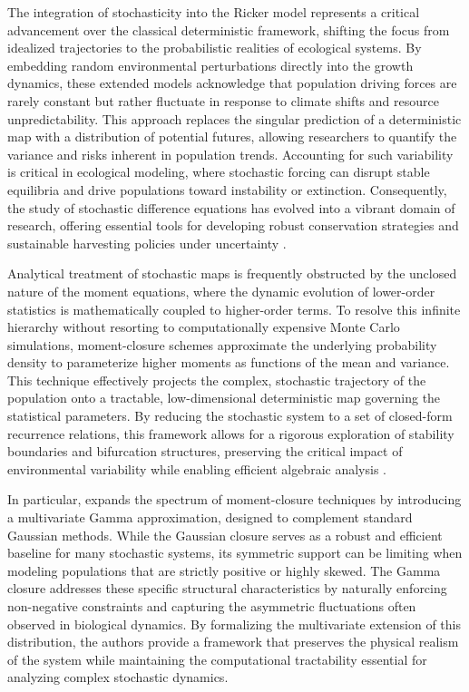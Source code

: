 \documentclass[12pt]{article}
\theoremstyle{definition}
\begin{document}
The integration of stochasticity into the Ricker model represents a critical advancement over the classical deterministic framework, shifting the focus from idealized trajectories to the probabilistic realities of ecological systems. By embedding random environmental perturbations directly into the growth dynamics, these extended models acknowledge that population driving forces are rarely constant but rather fluctuate in response to climate shifts and resource unpredictability. This approach replaces the singular prediction of a deterministic map with a distribution of potential futures, allowing researchers to quantify the variance and risks inherent in population trends. Accounting for such variability is critical in ecological modeling, where stochastic forcing can disrupt stable equilibria and drive populations toward instability or extinction. Consequently, the study of stochastic difference equations has evolved into a vibrant domain of research, offering essential tools for developing robust conservation strategies and sustainable harvesting policies under uncertainty \cite{allen2010,Arnold1998,kot2001elements,Schreiber2021,Braverman2013,Yan2024,Hognas1997,Kornadt1991}.


Analytical treatment of stochastic maps is frequently obstructed by the unclosed nature of the moment equations, where the dynamic evolution of lower-order statistics is mathematically coupled to higher-order terms. To resolve this infinite hierarchy without resorting to computationally expensive Monte Carlo simulations, moment-closure schemes approximate the underlying probability density to parameterize higher moments as functions of the mean and variance. This technique effectively projects the complex, stochastic trajectory of the population onto a tractable, low-dimensional deterministic map governing the statistical parameters. By reducing the stochastic system to a set of closed-form recurrence relations, this framework allows for a rigorous exploration of stability boundaries and bifurcation structures, preserving the critical impact of environmental variability while enabling efficient algebraic analysis \cite{Kuehn2016,Makarem2017,Marrec2023,Matis1996,Du2005,Hyon2008,allen2010,Socha2008,Lakatos_2015,Taylor2012}. 

In particular, \cite{Lakatos_2015} expands the spectrum of moment-closure techniques by introducing a multivariate Gamma approximation, designed to complement standard Gaussian methods. While the Gaussian closure serves as a robust and efficient baseline for many stochastic systems, its symmetric support can be limiting when modeling populations that are strictly positive or highly skewed. The Gamma closure addresses these specific structural characteristics by naturally enforcing non-negative constraints and capturing the asymmetric fluctuations often observed in biological dynamics. By formalizing the multivariate extension of this distribution, the authors provide a framework that preserves the physical realism of the system while maintaining the computational tractability essential for analyzing complex stochastic dynamics.
 
\end{document}
